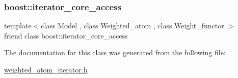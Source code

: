\subsubsection{\texorpdfstring{boost\+::iterator\+\_\+core\+\_\+access}{boost::iterator\_core\_access}}
{\footnotesize\ttfamily template$<$class Model , class Weighted\+\_\+atom , class Weight\+\_\+functor $>$ \\
friend class boost\+::iterator\+\_\+core\+\_\+access\hspace{0.3cm}{\ttfamily [friend]}}



The documentation for this class was generated from the following file\+:\begin{DoxyCompactItemize}
\item 
\hyperlink{weighted__atom__iterator_8h}{weighted\+\_\+atom\+\_\+iterator.\+h}\end{DoxyCompactItemize}

